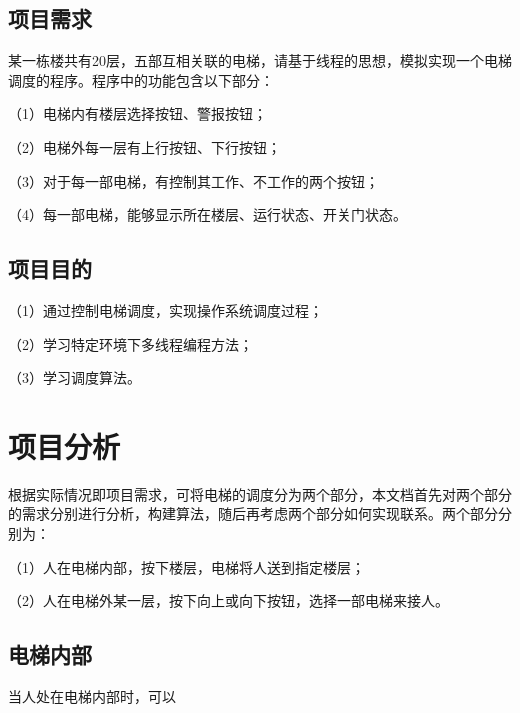 \documentclass{article}
\begin{document}
\begin{CJK}{UTF8}{gbsn}
\subsection{项目需求}
某一栋楼共有20层，五部互相关联的电梯，请基于线程的思想，模拟实现一个电梯调度的程序。程序中的功能包含以下部分：

（1）电梯内有楼层选择按钮、警报按钮；

（2）电梯外每一层有上行按钮、下行按钮；

（3）对于每一部电梯，有控制其工作、不工作的两个按钮；

（4）每一部电梯，能够显示所在楼层、运行状态、开关门状态。


\subsection{项目目的}

（1）通过控制电梯调度，实现操作系统调度过程；

（2）学习特定环境下多线程编程方法；

（3）学习调度算法。

\vspace{3em}

\section{项目分析}
根据实际情况即项目需求，可将电梯的调度分为两个部分，本文档首先对两个部分的需求分别进行分析，构建算法，随后再考虑两个部分如何实现联系。两个部分分别为：

（1）人在电梯内部，按下楼层，电梯将人送到指定楼层；

（2）人在电梯外某一层，按下向上或向下按钮，选择一部电梯来接人。

\subsection{电梯内部}
当人处在电梯内部时，可以



\end{CJK}
\end{document}
